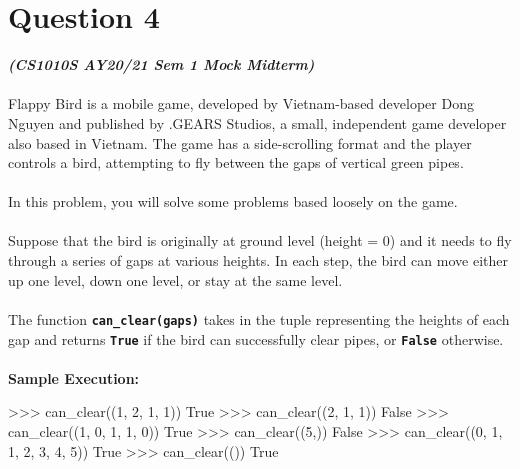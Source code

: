 \section{Question 4}
\textbf{\textit{(CS1010S AY20/21 Sem 1 Mock Midterm)}} \\ \\
Flappy Bird is a mobile game, developed by Vietnam-based developer Dong Nguyen and published by .GEARS Studios,
a small, independent game developer also based in Vietnam. The game has a side-scrolling format and the player 
controls a bird, attempting to fly between the gaps of vertical green pipes. \\ \\
In this problem, you will solve some problems based loosely on the game. \\ \\
Suppose that the bird is originally at ground level (height = 0) and it needs to fly through a series of gaps 
at various heights. In each step, the bird can move either up one level, down one level, or stay at the same 
level. \\ \\
The function \texttt{\bfseries can\_clear(gaps)} takes in the tuple representing the heights of each gap and
returns \texttt{\bfseries True} if the bird can successfully clear pipes, or \texttt{\bfseries False} otherwise. \\ \\
\textbf{Sample Execution:}
\begin{python}
>>> can_clear((1, 2, 1, 1))
True
>>> can_clear((2, 1, 1))
False
>>> can_clear((1, 0, 1, 1, 0))
True
>>> can_clear((5,))
False
>>> can_clear((0, 1, 1, 2, 3, 4, 5))
True
>>> can_clear(())
True
\end{python}
